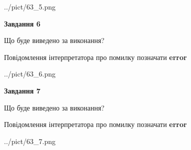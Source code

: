 \documentclass[10pt, ukrainian]{article}
\begin{document}
{\begin {large}
\begin{center}
	{../pict/63_5.png}
\end{center}
\newpage

{\begin {center}\textbf{Завдання 6}\end {center}}\par
Що буде виведено за виконання? \par
Повідомлення інтерпретатора про помилку позначати \textbf{error}

\begin{center}
	{../pict/63_6.png}
\end{center}
\newpage

{\begin {center}\textbf{Завдання 7}\end {center}}\par
Що буде виведено за виконання? \par
Повідомлення інтерпретатора про помилку позначати \textbf{error}

\begin{center}
	{../pict/63_7.png}
\end{center}
\newpage

\end {large}}
\end{document}
